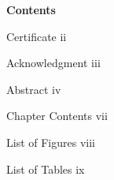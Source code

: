 \documentclass[12pt,a4paper]{report}
\begin{document}
\newpage
\begin{center}
	\textbf{\large {Contents}}
\end{center}

Certificate \hspace{235pt} 	ii

Acknowledgment \hspace{200pt} iii

Abstract \hspace{242pt} iv

Chapter Contents \hspace{195pt} vii

List of Figures \hspace{211pt} viii

List of Tables\hspace{220pt} ix

\tableofcontents 

\listoffigures

\listoftables
\newpage

\end{document}
